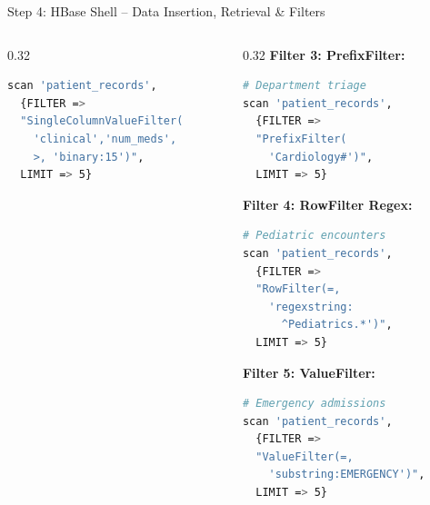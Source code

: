 \documentclass[aspectratio=169]{beamer}
\begin{document}
\begin{frame}[fragile,shrink=5]{Step 4: HBase Shell -- Data Insertion, Retrieval \& Filters}
\begin{columns}[T]
\begin{column}{0.32\textwidth}
            \begin{lstlisting}[language=bash]
scan 'patient_records', 
  {FILTER => 
  "SingleColumnValueFilter(
    'clinical','num_meds',
    >, 'binary:15')", 
  LIMIT => 5}
            \end{lstlisting}
        \end{column}
        \begin{column}{0.32\textwidth}
            \textbf{\textcolor{AmritaMaroon}{Filter 3: PrefixFilter:}}
            \begin{lstlisting}[language=bash]
# Department triage
scan 'patient_records', 
  {FILTER => 
  "PrefixFilter(
    'Cardiology#')", 
  LIMIT => 5}
            \end{lstlisting}
            \vspace{0.05cm}
            \textbf{\textcolor{AmritaMaroon}{Filter 4: RowFilter Regex:}}
            \begin{lstlisting}[language=bash]
# Pediatric encounters
scan 'patient_records', 
  {FILTER => 
  "RowFilter(=, 
    'regexstring:
      ^Pediatrics.*')", 
  LIMIT => 5}
            \end{lstlisting}
            \vspace{0.05cm}
            \textbf{\textcolor{AmritaMaroon}{Filter 5: ValueFilter:}}
            \begin{lstlisting}[language=bash]
# Emergency admissions
scan 'patient_records', 
  {FILTER => 
  "ValueFilter(=, 
    'substring:EMERGENCY')",
  LIMIT => 5}
            \end{lstlisting}
        \end{column}
    \end{columns}
\end{frame}
\end{document}
